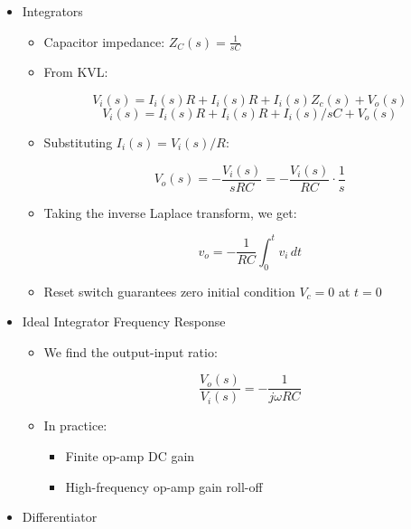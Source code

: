 \begin{itemize}

  \item Integrators

    \begin{itemize}

      \item Capacitor impedance: $Z_C(s)=\frac{1}{sC}$

      \item From KVL:

        $$V_i(s)=I_i(s)R+I_i(s)R+I_i(s)Z_c(s)+V_o(s)$$
        $$V_i(s)=I_i(s)R+I_i(s)R+I_i(s)/sC+V_o(s)$$

      \item Substituting $I_i(s)=V_i(s)/R$:

        $$V_o(s)=-\frac{V_i(s)}{sRC}=-\frac{V_i(s)}{RC}\cdot\frac{1}{s}$$

      \item Taking the inverse Laplace transform, we get:

        $$v_o=-\frac{1}{RC}\int_0^t v_i\,dt$$

      \item Reset switch guarantees zero initial condition $V_c=0$ at $t=0$

    \end{itemize}

  \item Ideal Integrator Frequency Response

    \begin{itemize}

      \item We find the output-input ratio:

        $$\frac{V_o(s)}{V_i(s)}=-\frac{1}{j\omega RC}$$

      \item In practice:

        \begin{itemize}

          \item Finite op-amp DC gain

          \item High-frequency op-amp gain roll-off

        \end{itemize}

    \end{itemize}

  \item Differentiator


\end{itemize}
